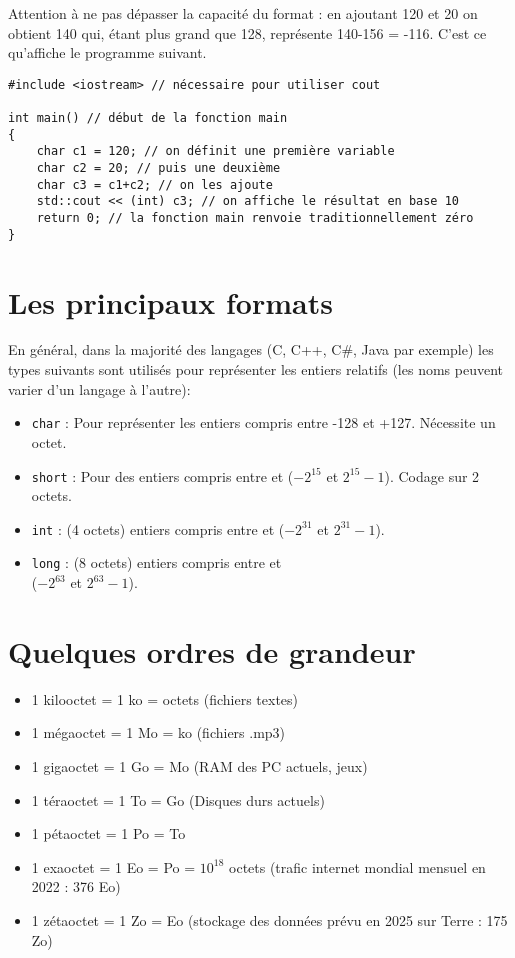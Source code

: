 Attention à ne pas dépasser la capacité du format : en ajoutant 120 et 20 on obtient 140 qui, étant plus grand que 128, représente 140-156 = -116. C'est ce qu'affiche le programme suivant.
\begin{verbatim}
#include <iostream> // nécessaire pour utiliser cout

int main() // début de la fonction main
{
    char c1 = 120; // on définit une première variable
    char c2 = 20; // puis une deuxième
    char c3 = c1+c2; // on les ajoute
    std::cout << (int) c3; // on affiche le résultat en base 10
    return 0; // la fonction main renvoie traditionnellement zéro
}
\end{verbatim}

\section{Les principaux formats}

En général, dans la majorité des langages (C, C++, C\#, Java par exemple)  les types suivants
sont utilisés pour représenter les entiers relatifs (les noms peuvent varier d'un langage à l'autre):
\begin{itemize}
    \item  \texttt{char} :  Pour représenter les entiers compris entre -128 et +127. Nécessite un octet.
    \item  \texttt{short} :  Pour des entiers compris entre  et  ($-2^{15}$ et $2^{15}-1$). Codage sur 2
          octets.
    \item  \texttt{int} :  (4 octets) entiers compris entre  et  ($-2^{31}$ et $2^{31}-1$).
    \item  \texttt{long} : (8 octets) entiers compris entre  et\\  ($-2^{63}$ et
          $2^{63}-1$).
\end{itemize}

\section{Quelques ordres de grandeur}
\begin{itemize}
    \item   1 kilooctet = 1 ko =   octets (fichiers textes)
    \item   1 mégaoctet = 1 Mo =  ko (fichiers .mp3)
    \item   1 gigaoctet = 1 Go =  Mo (RAM des PC actuels, jeux)
    \item   1 téraoctet = 1 To =  Go (Disques durs actuels)
    \item   1 pétaoctet = 1 Po =  To
    \item   1 exaoctet = 1 Eo =  Po = $10^{18}$ octets (trafic internet mondial mensuel en 2022 : 376 Eo)
    \item   1 zétaoctet = 1 Zo =  Eo (stockage des données prévu en 2025 sur Terre : 175 Zo)
\end{itemize}

